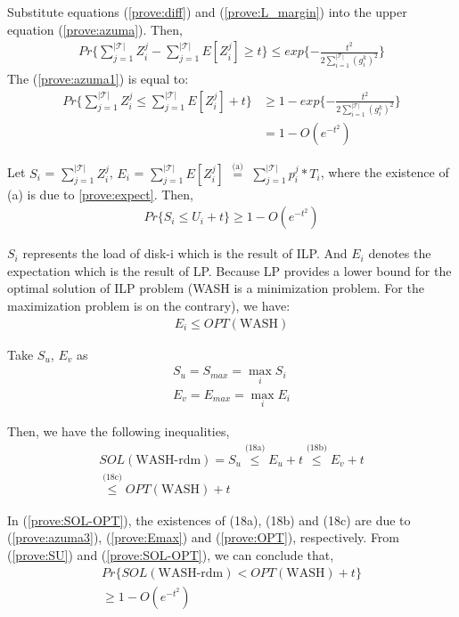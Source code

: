 \documentclass[conference]{IEEEtran}
\begin{document}
Substitute equations (\ref{prove:diff}) and (\ref{prove:L_margin}) into the upper equation (\ref{prove:azuma}). Then, 
\begin{align}
Pr\{\sum_{j = 1}^{|\mathcal{T}|} Z_i^j - 
	\sum_{j = 1}^{|\mathcal{T}|} E[Z_i^j]\geq t\} \leq exp\{-\frac{t^2}{2\sum_{ i = 1 }^{|\mathcal{T}|}(g_i^k)^2}\} \label{prove:azuma1}
\end{align}
 The (\ref{prove:azuma1}) is equal to:
\begin{align}
Pr\{\sum_{j = 1}^{|\mathcal{T}|} Z_i^j \leq \sum_{j = 1}^{|\mathcal{T}|} E[Z_i^j] + t\} & \geq 1 - exp\{-\frac{t^2}{2\sum_{ i = 1 }^{|\mathcal{T}|}(g_i^k)^2}\}\nonumber\\
& = 1 - O(e^{-t^2})\label{prove:azuma3}
\end{align}

Let $S_i$  = $\sum_{j = 1}^{|\mathcal{T}|} Z_i^j$,
$E_i$ = $\sum_{j = 1}^{|\mathcal{T}|} E[Z_i^j]$
$\overset{\text{(a)}}{=}$
$\sum_{j = 1}^{|\mathcal{T}|} p_i^j*T_i$, where the existence of (a) is due to \ref{prove:expect}. Then,
\begin{align}
Pr\{S_i \leq U_i + t\} \geq 1- O(e^{-t^2}) \label{prove:SU}
\end{align}

$S_i$ represents the load of disk-i which is the result of ILP. And $E_i$ denotes the expectation which is the result of LP. Because LP provides a lower bound for the optimal solution of ILP problem (WASH is a minimization problem. For the maximization problem is on the contrary), we have:
\begin{align}
E_i \leq OPT(\text{WASH})\label{prove:OPT}
\end{align}

Take $S_u$, $E_v$ as
\begin{align}
	S_u = S_{max} = \max_i S_i\\
	E_v = E_{max} = \max_i E_i\label{prove:Emax}
\end{align}

Then, we have the following inequalities,
\begin{align}
SOL(\text{WASH-rdm}) = S_u  
\overset{\text{(18a)}}{\leq}  E_u+t
\overset{\text{(18b)}}{\leq} E_v+t\nonumber\\
\overset{\text{(18c)}}{\leq} OPT(\text{WASH})+t\label{prove:SOL-OPT}
\end{align}

In (\ref{prove:SOL-OPT}), the existences of (18a), (18b) and (18c) are due to (\ref{prove:azuma3}), (\ref{prove:Emax}) and (\ref{prove:OPT}), respectively.  From (\ref{prove:SU}) and (\ref{prove:SOL-OPT}), we can conclude that,
\begin{align}
Pr\{SOL(\text{WASH-rdm})<OPT (\text{WASH})+t\}\nonumber\\ 
\geq 1 - O(e^{-t^2})\label{prove:result}
\end{align}
\end{document}
